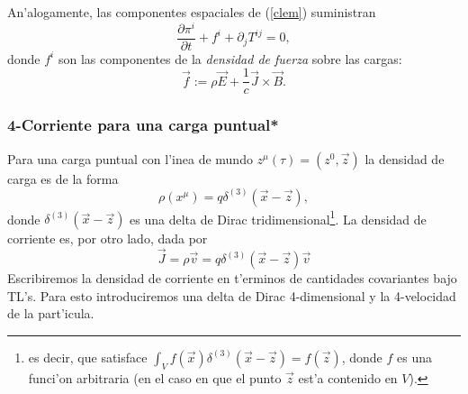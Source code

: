 An'alogamente, las componentes espaciales de (\ref{clem}) suministran
\begin{equation}
\frac{\partial \pi^i}{\partial t}+f^i  +\partial_jT^{ij}=0,
\end{equation}
donde $f^i$ son las componentes de la \textit{densidad de fuerza} sobre las cargas:
\begin{equation}
\vec{f} :=\rho \vec{E}  +\frac{1}{c}\vec{J}\times \vec{B}.
\end{equation}

\subsubsection{4-Corriente para una carga puntual*}
Para una carga puntual con l'inea de mundo $z^\mu(\tau)=(z^0,\vec{z})$ la
densidad de carga es de la forma
\begin{equation}
\rho(x^\mu)=q\delta^{(3)}\left(\vec{x}-\vec{z}\right) ,
\end{equation}
donde $\delta^{(3)}\left(\vec{x}-\vec{z}\right)$ es una delta de Dirac
tridimensional\footnote{es decir, que satisface $\int_V
f(\vec{x})\delta^{(3)}\left(\vec{x}-\vec{z}\right)=f(\vec{z})$, donde $f$ es una
funci'on arbitraria (en el caso en que el punto $\vec{z}$ est'a contenido en
$V$).}. La densidad de corriente es, por otro lado, dada por
\begin{equation}
\vec{J}=\rho\vec{v}=q\delta^{(3)}\left(\vec{x}-\vec{z}\right)\vec{v}
\end{equation}
Escribiremos la densidad de corriente en t'erminos de cantidades covariantes
bajo TL's. Para esto introduciremos una delta de Dirac 4-dimensional y la
4-velocidad de la part'icula.

